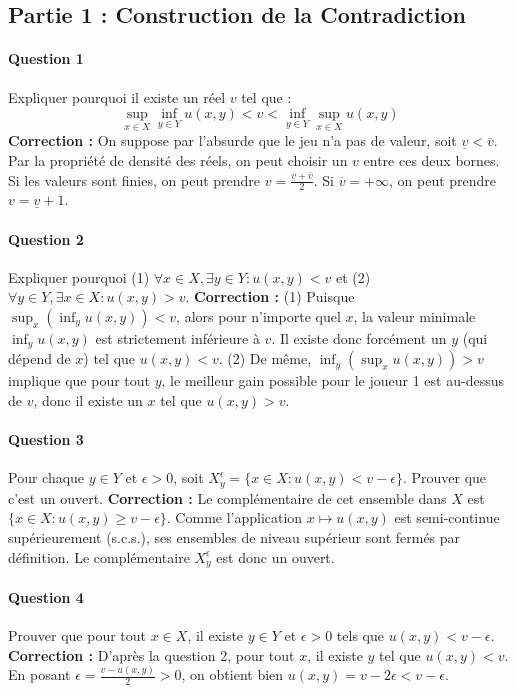 \subsection{Partie 1 : Construction de la Contradiction}

\paragraph{Question 1} Expliquer pourquoi il existe un réel $v$ tel que :
$$ \sup_{x \in X} \inf_{y \in Y} u(x,y) < v < \inf_{y \in Y} \sup_{x \in X} u(x,y) $$
\textbf{Correction :} On suppose par l'absurde que le jeu n'a pas de valeur, soit $\underline{v} < \overline{v}$. Par la propriété de densité des réels, on peut choisir un $v$ entre ces deux bornes. Si les valeurs sont finies, on peut prendre $v = \frac{\underline{v} + \overline{v}}{2}$. Si $\overline{v} = +\infty$, on peut prendre $v = \underline{v} + 1$.

\paragraph{Question 2} Expliquer pourquoi (1) $\forall x \in X, \exists y \in Y : u(x,y) < v$ et (2) $\forall y \in Y, \exists x \in X : u(x,y) > v$.
\textbf{Correction :} 
(1) Puisque $\sup_x (\inf_y u(x,y)) < v$, alors pour n'importe quel $x$, la valeur minimale $\inf_y u(x,y)$ est strictement inférieure à $v$. Il existe donc forcément un $y$ (qui dépend de $x$) tel que $u(x,y) < v$. 
(2) De même, $\inf_y (\sup_x u(x,y)) > v$ implique que pour tout $y$, le meilleur gain possible pour le joueur 1 est au-dessus de $v$, donc il existe un $x$ tel que $u(x,y) > v$.

\paragraph{Question 3} Pour chaque $y \in Y$ et $\epsilon > 0$, soit $X_y^\epsilon = \{x \in X : u(x,y) < v - \epsilon\}$. Prouver que c'est un ouvert.
\textbf{Correction :} Le complémentaire de cet ensemble dans $X$ est $\{x \in X : u(x,y) \geq v - \epsilon\}$. Comme l'application $x \mapsto u(x,y)$ est semi-continue supérieurement (s.c.s.), ses ensembles de niveau supérieur sont fermés par définition. Le complémentaire $X_y^\epsilon$ est donc un ouvert.

\paragraph{Question 4} Prouver que pour tout $x \in X$, il existe $y \in Y$ et $\epsilon > 0$ tels que $u(x,y) < v - \epsilon$.
\textbf{Correction :} D'après la question 2, pour tout $x$, il existe $y$ tel que $u(x,y) < v$. En posant $\epsilon = \frac{v - u(x,y)}{2} > 0$, on obtient bien $u(x,y) = v - 2\epsilon < v - \epsilon$.

